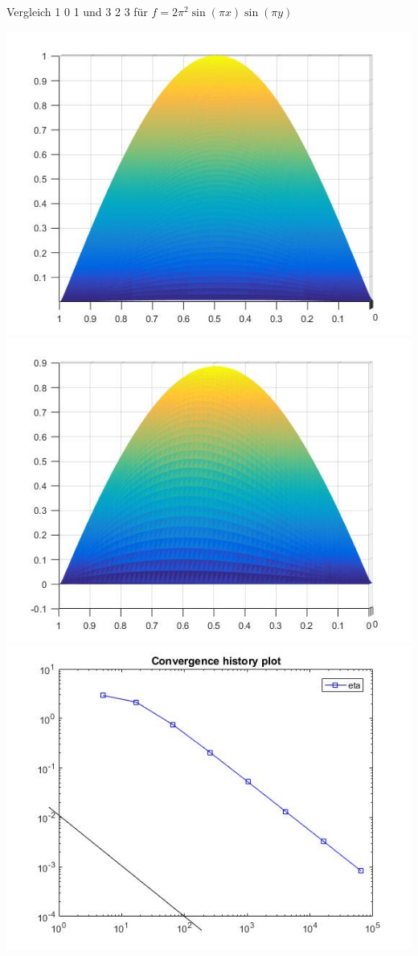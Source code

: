 \documentclass[xcolor=svgnames,ngerman]{beamer}
\begin{document}
	
	
					\begin{frame}{Vergleich 1 0 1 und 3 2 3 für $f=2\pi ^2 \sin (\pi x) \sin (\pi y)$}
\begin{center}
	\includegraphics[scale=0.25]{101p.jpg}
	\includegraphics[scale=0.25]{323p.jpg}\\
	\includegraphics[scale=0.25]{101plot.jpg}

\end{center}
\end{frame}
\end{document}
